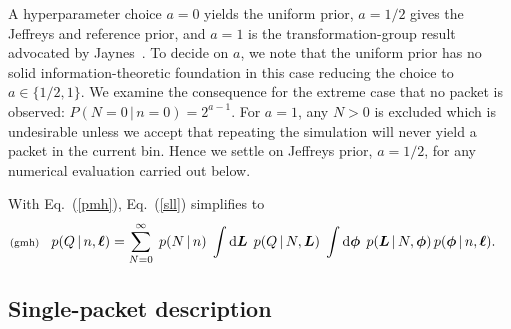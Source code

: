 \documentclass[11pt]{article}
\newcommand{\lleq}[1]{\label{#1} }
\renewcommand{\lleq}[1]{\label{#1} {\scriptstyle {\rm (#1)}} \hspace*{2ex} }
\newcommand{\cond}{\,|\,}
\newcommand{\refeq}[1]{Eq.~(\ref{#1})}
\newcommand{\rmdx}[1]{\dd{#1}} %
\begin{document}
A hyperparameter choice $a=0$ yields the uniform prior, $a=1/2$ gives
the Jeffreys and reference prior, and $a=1$ is the
transformation-group result advocated by
Jaynes~\cite[Ch. 12]{jaynes2003probability}. To decide on $a$, we note
that the uniform prior has no solid information-theoretic foundation
in this case reducing the choice to $a \in \{1/2, 1\}$. We examine the
consequence for the extreme case that no packet is observed:
$P(N=0 \cond n=0) = 2^{a-1}$. For $a=1$, any $N>0$ is excluded which
is undesirable unless we accept that repeating the simulation will
never yield a packet in the current bin. Hence we settle on Jeffreys
prior, $a=1/2$, for any numerical evaluation carried out below.

With \refeq{pmh}, \refeq{sll} simplifies to
\begin{align}
  \lleq{gmh}
  p(Q\cond n,\bml)
  &= \sum_{N=0}^\infty \;
    p(N\cond n)\;
    \int \rmdx{\bmL}\;
    p(Q\cond N,\bmL)\;
    \int \rmdx{\bmphi}\;
    p(\bmL\cond N,\bmphi)\,
    p(\bmphi\cond n,\bml).
\end{align}

\subsection{Single-packet description} \label{sec:single-packet}
\end{document}
